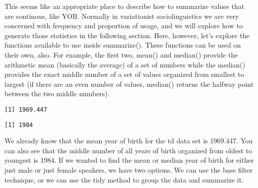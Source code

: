 \documentclass[
  12pt,
  letterpaper]{article}
\newenvironment{Shaded}{\begin{snugshade}}{\end{snugshade}}
\newcommand{\CommentTok}[1]{\textcolor[rgb]{0.37,0.37,0.37}{#1}}
\newcommand{\FunctionTok}[1]{\textcolor[rgb]{0.28,0.35,0.67}{#1}}
\newcommand{\NormalTok}[1]{\textcolor[rgb]{0.00,0.23,0.31}{#1}}
\newcommand{\SpecialCharTok}[1]{\textcolor[rgb]{0.37,0.37,0.37}{#1}}
\newcommand{\StringTok}[1]{\textcolor[rgb]{0.13,0.47,0.30}{#1}}
\renewcommand\texttt[1]{{\ttfamily\color{BrickRed}#1}}
\begin{document}
This seems like an appropriate place to describe how to summarize values
that are continous, like \texttt{YOB}. Normally in variationist
sociolinguistics we are very concerned with frequency and proportion of
usage, and we will explore how to generate those statistics in the
following section. Here, however, let's explore the functions available
to use inside \texttt{summarize()}. These functions can be used on their
own, also. For example, the first two, \texttt{mean()} and
\texttt{median()} provide the arithmetic mean (basically the average) of
a set of numbers while the \texttt{median()} provides the exact middle
number of a set of values organized from smallest to largest (if there
are an even number of values, \texttt{median()} returns the halfway
point between the two middle numbers).

\begin{Shaded}
\end{Shaded}

\begin{verbatim}
[1] 1969.447
\end{verbatim}

\begin{Shaded}
\end{Shaded}

\begin{verbatim}
[1] 1984
\end{verbatim}

We already know that the mean year of birth for the \texttt{td} data set
is 1969.447. You can also see that the middle number of all years of
birth organized from oldest to youngest is 1984. If we wanted to find
the mean or median year of birth for either just male or just female
speakers, we have two options. We can use the base filter technique, or
we can use the \texttt{tidy} method to group the data and summarize it.

\begin{Shaded}
\end{Shaded}
\end{document}
